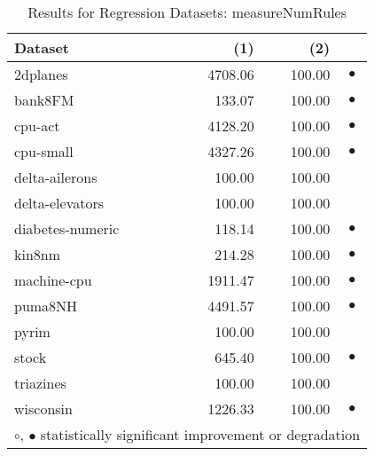 \documentclass{article}
\begin{document}
\begin{table}[H]
\caption{\label{labelname}Results for Regression Datasets: measureNumRules}
\footnotesize
{\centering \begin{tabular}{lrr@{\hspace{0.1cm}}c}
\\
\hline
Dataset & (1)& (2) & \\
\hline
2dplanes & 4708.06 & 100.00 & $\bullet$\\
bank8FM &  133.07 & 100.00 & $\bullet$\\
cpu-act & 4128.20 & 100.00 & $\bullet$\\
cpu-small & 4327.26 & 100.00 & $\bullet$\\
delta-ailerons &  100.00 & 100.00 &          \\
delta-elevators &  100.00 & 100.00 &          \\
diabetes-numeric &  118.14 & 100.00 & $\bullet$\\
kin8nm &  214.28 & 100.00 & $\bullet$\\
machine-cpu & 1911.47 & 100.00 & $\bullet$\\
puma8NH & 4491.57 & 100.00 & $\bullet$\\
pyrim &  100.00 & 100.00 &          \\
stock &  645.40 & 100.00 & $\bullet$\\
triazines &  100.00 & 100.00 &          \\
wisconsin & 1226.33 & 100.00 & $\bullet$\\
\hline
\multicolumn{4}{c}{$\circ$, $\bullet$ statistically significant improvement or degradation}\\
\end{tabular} \footnotesize \par}
\end{table}
\end{document}
